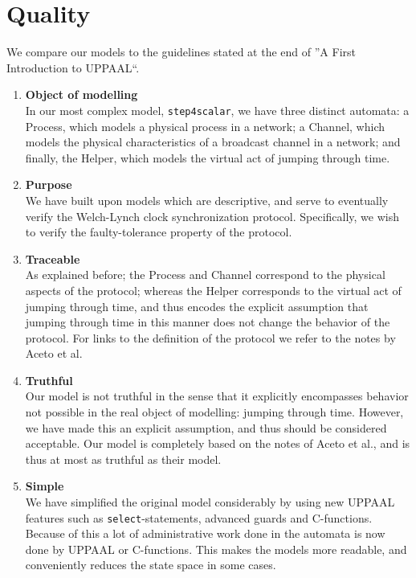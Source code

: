 \documentclass[a4paper,10pt]{article}
\newcommand{\UPPAAL}{UPPAAL\xspace}
\begin{document}
\section{Quality\label{sec:quality}}


We compare our models to the guidelines stated at the end of ''A First Introduction to UPPAAL``. \cite{Vaandrager2011First}

\begin{enumerate}
\item \textbf{Object of modelling} \\
	In our most complex model, \texttt{step4scalar}, we have three distinct automata: a Process, which models a physical process in a network; a Channel, which models the physical characteristics of a broadcast channel in a network; and finally, the Helper, which models the virtual act of jumping through time.
\item \textbf{Purpose} \\
	We have built upon models which are descriptive, and serve to eventually verify the Welch-Lynch clock synchronization protocol. Specifically, we wish to verify the faulty-tolerance property of the protocol.
\item \textbf{Traceable} \\
	As explained before; the Process and Channel correspond to the physical aspects of the protocol; whereas the Helper corresponds to the virtual act of jumping through time, and thus encodes the explicit assumption that jumping through time in this manner does not change the behavior of the protocol. For links to the definition of the protocol we refer to the notes by Aceto et al. \cite{Aceto2004Notes}
\item \textbf{Truthful} \\
	Our model is not truthful in the sense that it explicitly encompasses behavior not possible in the real object of modelling: jumping through time. However, we have made this an explicit assumption, and thus should be considered acceptable. Our model is completely based on the notes of Aceto et al., and is thus at most as truthful as their model.
\item \textbf{Simple} \\
	We have simplified the original model considerably by using new \UPPAAL features such as \texttt{select}-statements, advanced guards and C-functions. Because of this a lot of administrative work done in the automata is now done by \UPPAAL or C-functions. This makes the models more readable, and conveniently reduces the state space in some cases.

\end{enumerate}
\end{document}
